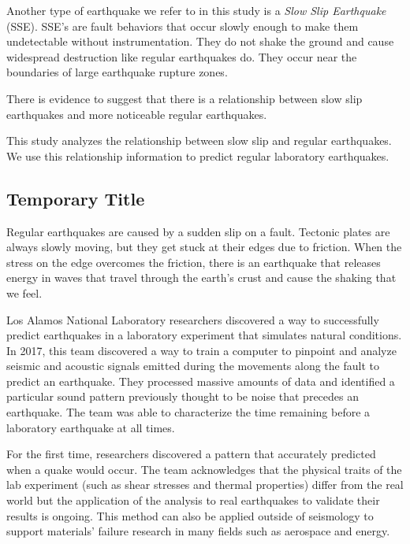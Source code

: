 \documentclass[]{llncs}
\begin{document}
Another type of earthquake we refer to in this study is a {\em 
	Slow Slip Earthquake} (SSE). SSE's are fault behaviors that occur slowly enough to make them undetectable without instrumentation. They do not shake the ground and cause widespread destruction like regular earthquakes do. They occur near the boundaries of large earthquake rupture zones\cite{Slip}. \par

There is evidence to suggest that there is a relationship between slow slip earthquakes and more noticeable regular earthquakes\cite{SlowSlip}. \par

This study analyzes the relationship between slow slip and regular earthquakes. We use this relationship information to predict regular laboratory earthquakes. \par
\subsection{Temporary Title}
Regular earthquakes are caused by a sudden slip on a fault. Tectonic plates are always slowly moving, but they get stuck at their edges due to friction. When the stress on the edge overcomes the friction, there is an earthquake that releases energy in waves that travel through the earth's crust and cause the shaking that we feel.\cite{USGSfaqs}\par

Los Alamos National Laboratory researchers discovered a way to successfully predict earthquakes in a laboratory experiment that simulates natural conditions. In 2017, this team discovered a way to train a computer to pinpoint and analyze seismic and acoustic signals emitted during the movements along the fault to predict an earthquake. They processed massive amounts of data and identified a particular sound pattern previously thought to be noise that precedes an earthquake. The team was able to characterize the time remaining before a laboratory earthquake at all times.\cite{LANLNews} \par

For the first time, researchers discovered a pattern that accurately predicted when a quake would occur. The team acknowledges that the physical traits of the lab experiment (such as shear stresses and thermal properties) differ from the real world but the application of the analysis to real earthquakes to validate their results is ongoing. This method can also be applied outside of seismology to support materials’ failure research in many fields such as aerospace and energy.\cite{LANLNews}\par
\end{document}
